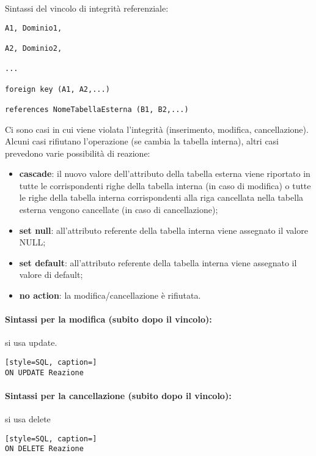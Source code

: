 Sintassi del vincolo di integrità referenziale:

\begin{lstlisting}[style=SQL, caption=Integrità referenziale]
A1, Dominio1,
    
A2, Dominio2,
    
...

foreign key (A1, A2,...)

references NomeTabellaEsterna (B1, B2,...)
\end{lstlisting}

Ci sono casi in cui viene violata l'integrità (inserimento, modifica, cancellazione). Alcuni casi rifiutano l'operazione (se cambia la tabella interna), altri casi prevedono varie possibilità di reazione:

\begin{itemize}
    \item \textbf{cascade}: il nuovo valore dell’attributo della tabella esterna viene riportato in tutte le corrispondenti
righe della tabella interna (in caso di modifica) o tutte le righe della tabella interna corrispondenti alla riga cancellata nella tabella esterna vengono cancellate (in caso di cancellazione);
\item \textbf{set null}: all’attributo referente della tabella interna viene assegnato il valore NULL;
\item \textbf{set default}: all’attributo referente della tabella interna viene assegnato il valore di default;
\item \textbf{no action}: la modifica/cancellazione è rifiutata.
\end{itemize}
\pagebreak
\paragraph{Sintassi per la modifica (subito dopo il vincolo):} si usa update.

\begin{lstlisting}[style=SQL, caption=]
ON UPDATE Reazione
\end{lstlisting}

\paragraph{Sintassi per la cancellazione (subito dopo il vincolo):}  si usa delete

\begin{lstlisting}[style=SQL, caption=]
ON DELETE Reazione
\end{lstlisting}


